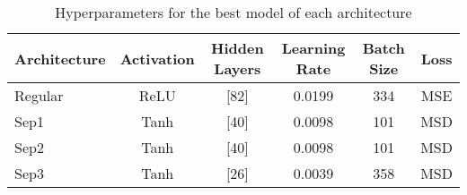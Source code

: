 \begin{table}[!htbp]
    \centering
    \caption{Hyperparameters for the best model of each architecture}
    \begin{tabular}{lccccc}
        \toprule
        Architecture & Activation & Hidden Layers & Learning Rate & Batch Size & Loss \\
        \midrule
        Regular &  ReLU & [82] & 0.0199 & 334 & MSE \\
        Sep1    &  Tanh & [40] & 0.0098 & 101 & MSD \\
        Sep2    &  Tanh & [40] & 0.0098 & 101 & MSD \\
        Sep3    &  Tanh & [26] & 0.0039 & 358 & MSD \\
        \bottomrule
    \end{tabular}
    \label{tab:exp1_hyperparameters_best_model}
\end{table}

